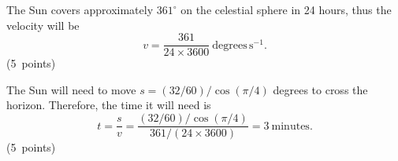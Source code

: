 The Sun covers approximately $361^\circ$ on the celestial sphere in 24 hours, thus the velocity will be
\[
v=\frac{361}{24\times3600}\ \mathrm{degrees\,s^{-1}}.
\]
\hfill\mbox{(5 points)}

The Sun will need to move $s=(32/60)/\cos(\pi/4)$ degrees to cross the horizon. Therefore, the time it will need is
\[
t=\frac{s}{v}=\frac{(32/60)/\cos(\pi/4)}{361/(24\times3600)}=3\ \mathrm{minutes}.
\]
\hfill\mbox{(5 points)}
